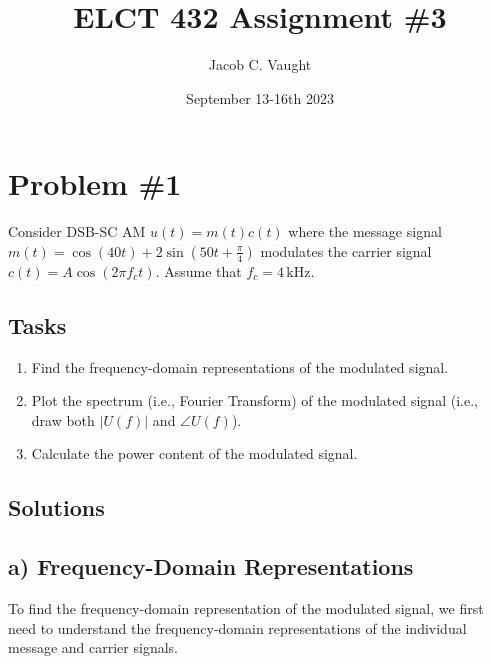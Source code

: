 \documentclass{article}
\title{ELCT 432 Assignment \#3}
\author{Jacob C. Vaught}
\date{September 13-16th 2023}
\begin{document}
\maketitle

\newpage
\section*{Problem \#1}
Consider DSB-SC AM \( u(t) = m(t)c(t) \) where the message signal \( m(t) = \cos(40t) + 2\sin \left(50t + \frac{\pi}{4}\right) \) modulates the carrier signal \( c(t) = A\cos(2\pi f_c t) \). Assume that \( f_c = 4 \, \text{kHz} \).

\subsection*{Tasks}
\begin{enumerate}
    \item Find the frequency-domain representations of the modulated signal.
    \item Plot the spectrum (i.e., Fourier Transform) of the modulated signal (i.e., draw both \( |U(f)| \) and \( \angle U(f) \)).
    \item Calculate the power content of the modulated signal.
\end{enumerate}

\subsection*{Solutions}
\subsection*{a) Frequency-Domain Representations}

To find the frequency-domain representation of the modulated signal, we first need to understand the frequency-domain representations of the individual message and carrier signals.
\end{document}
